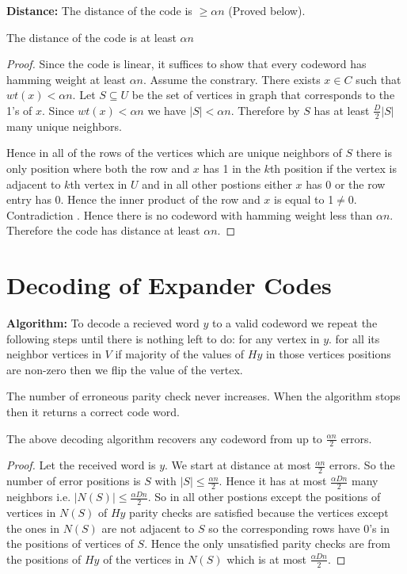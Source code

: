 \textbf{Distance:} The distance of the code is $\geq \alpha n$ (Proved below).\parinn

\begin{theorem}
	The distance of the code is at least $\alpha n$
\end{theorem}
\begin{proof}
	Since the code is linear, it suffices to show that every codeword has hamming weight at least $\alpha n$. Assume the constrary. There exists $x\in C$ such that $wt(x)<\alpha n$. Let $S\subseteq U$ be the set of vertices in graph that corresponds to the 1's of $x$. Since $wt(x)<\alpha n$ we have $|S|<\alpha n$. Therefore by  $S$ has at least $\frac{D}{2}|S|$ many unique neighbors.
	
	Hence in all of the rows of the vertices which are unique neighbors of $S$ there is only position where both the row and $x$ has 1 in the $k$th position if the vertex is adjacent to $k$th vertex in $U$ and in all other postions either $x$ has 0 or the row entry has 0. Hence the inner product of the row and $x$ is equal to 1$\neq 0$. Contradiction \ctr. Hence there is no codeword with hamming weight less than $\alpha n$. Therefore the code has distance at least $\alpha n$.
\end{proof}
\section{Decoding of Expander Codes}
\textbf{Algorithm:} To decode a recieved word $y$ to a valid codeword we repeat the following steps until there is nothing left to do: for any vertex in $y$. for all its neighbor vertices in $V$ if majority of the values of $Hy$ in those vertices positions are non-zero then we flip the value of the vertex.\vspace{3mm}

\begin{remark}
		 The number of erroneous parity check never increases.
		When the algorithm stops then it returns a correct code word.
\end{remark}
\begin{theorem}
	The above decoding algorithm recovers any codeword from up to $\frac{\alpha n}2$ errors.
\end{theorem}
\begin{proof}
	Let the received word is $y$. We start at distance at most $\frac{\alpha n}2$ errors. So the number of error positions is $S$ with $|S|\leq \frac{\alpha n}{2}$. Hence it has at most $\frac{\alpha Dn}2$ many neighbors i.e. $|N(S)|\leq \frac{\alpha Dn}2$. So in all other postions except the positions of vertices in $N(S)$ of $Hy$ parity checks are satisfied because the vertices except the ones in $N(S)$ are not adjacent to $S$ so the corresponding rows have 0's in the positions of vertices of $S$. Hence the only unsatisfied parity checks are from the positions of $Hy$ of the vertices in $N(S)$ which is at most $\frac{\alpha Dn}2$. 
\end{proof}